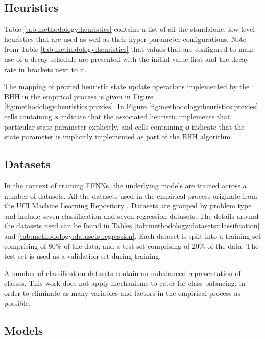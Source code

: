 \subsection{Heuristics}\label{sec:methodology:heuristics}

Table \ref{tab:methodology:heuristics} contains a list of all the standalone, low-level heuristics that are used as well as their hyper-parameter configurations. Note from Table \ref{tab:methodology:heuristics} that values that are configured to make use of a decay schedule are presented with the initial value first and the decay rate in brackets next to it.

The mapping of proxied heuristic state update operations implemented by the \acs{BHH} in the empirical process is given in Figure \ref{fig:methodology:heuristics:proxies}. In Figure \ref{fig:methodology:heuristics:proxies}, cells containing \textbf{x} indicate that the associated heuristic implements that particular state parameter explicitly, and cells containing \textbf{o} indicate that the state parameter is implicitly implemented as part of the \acs{BHH} algorithm.

\subsection{Datasets}\label{sec:methodology:datasets}

In the context of training \acp{FFNN}, the underlying models are trained across a number of datasets. All the datasets used in the empirical process originate from the UCI Machine Learning Repository \cite{ref:uci:2022}. Datasets are grouped by problem type and include seven classification and seven regression datasets. The details around the datasets used can be found in Tables \ref{tab:methodology:datasets:classification} and \ref{tab:methodology:datasets:regression}. Each dataset is split into a training set comprising of 80\% of the data, and a test set comprising of 20\% of the data. The test set is used as a validation set during training.

A number of classification datasets contain an unbalanced representation of classes. This work does not apply mechanisms to cater for class balancing, in order to eliminate as many variables and factors in the empirical process as possible.

\subsection{Models}\label{sec:methodology:model}

